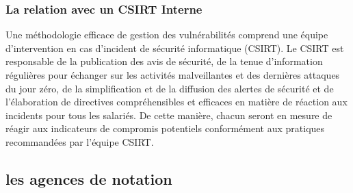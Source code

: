 \subsubsection{La relation avec un CSIRT Interne }

	Une méthodologie efficace de gestion des vulnérabilités comprend une équipe d’intervention en cas d’incident de sécurité informatique (CSIRT). Le CSIRT est responsable de la publication des avis de sécurité, de la tenue d'information régulières pour échanger sur les activités malveillantes et des dernières attaques du jour zéro, de la simplification et de la diffusion des alertes de sécurité et de l’élaboration de directives compréhensibles et efficaces en matière de réaction aux incidents pour tous les salariés. De cette manière, chacun seront en mesure de réagir aux indicateurs de compromis potentiels conformément aux pratiques recommandées par l'équipe CSIRT.
	
	
\subsection{les agences de notation}


\utodo